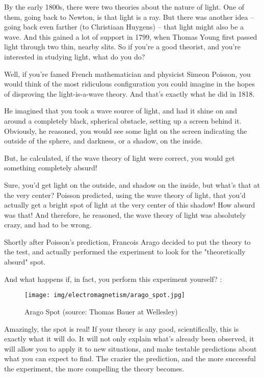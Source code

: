 	By the early 1800s, there were two theories about the nature of light. One of them, going back to Newton, is that light is a ray. But there was another idea – going back even farther (to Christiaan Huygens) – that light might also be a wave. And this gained a lot of support in 1799, when Thomas Young first passed light through two thin, nearby slits.  So if you're a good theorist, and you're interested in studying light, what do you do?
	
	Well, if you're famed French mathematician and physicist Simeon Poisson, you would think of the most ridiculous configuration you could imagine in the hopes of disproving the light-is-a-wave theory. And that's exactly what he did in 1818.

	He imagined that you took a wave source of light, and had it shine on and around a completely black, spherical obstacle, setting up a screen behind it. Obviously, he reasoned, you would see some light on the screen indicating the outside of the sphere, and darkness, or a shadow, on the inside.

	But, he calculated, if the wave theory of light were correct, you would get something completely absurd!

	Sure, you'd get light on the outside, and shadow on the inside, but what's that at the very center? Poisson predicted, using the wave theory of light, that you'd actually get a bright spot of light at the very center of this shadow! How absurd was that! And therefore, he reasoned, the wave theory of light was absolutely crazy, and had to be wrong.

	Shortly after Poisson's prediction, Francois Arago decided to put the theory to the test, and actually performed the experiment to look for the "theoretically absurd" spot.

	And what happens if, in fact, you perform this experiment yourself? :
	\begin{figure}[H]
		\centering
		\texttt{[image: img/electromagnetism/arago\_spot.jpg]}
		\caption{Arago Spot (source: Thomas Bauer at Wellesley)}
	\end{figure}

	Amazingly, the spot is real! If your theory is any good, scientifically, this is exactly what it will do. It will not only explain what's already been observed, it will allow you to apply it to new situations, and make testable predictions about what you can expect to find. The crazier the prediction, and the more successful the experiment, the more compelling the theory becomes.
	
